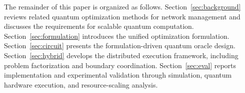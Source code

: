 \documentclass[journal]{IEEEtran}
\begin{document}
{The remainder of this paper is organized as follows. Section~\ref{sec:background} reviews related quantum optimization methods for network management and discusses the requirements for scalable quantum computation. Section~\ref{sec:formulation} introduces the unified optimization formulation. Section~\ref{sec:circuit} presents the formulation-driven quantum oracle design. Section~\ref{sec:hybrid} develops the distributed execution framework, including problem factorization and boundary coordination. Section~\ref{sec:eval} reports implementation and experimental validation through simulation, quantum hardware execution, and resource-scaling analysis.





}
\end{document}
